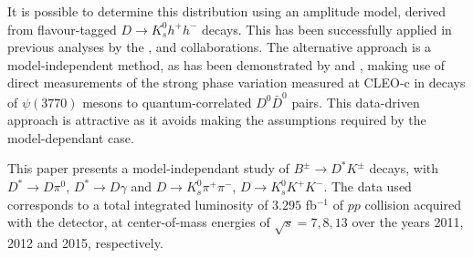 It is possible to determine this distribution using an amplitude model, derived from flavour-tagged $D\rightarrow K^0_sh^+h^-$ decays. This has been successfully applied in previous analyses by the \babar, \belle and \lhcb collaborations. The alternative approach is a model-independent method, as has been demonstrated by \belle and \lhcb, making use of direct  measurements of the strong phase
variation measured at CLEO-c in decays of $\psi(3770)$ mesons to quantum-correlated $D^0\bar{D}^0$ pairs. This data-driven approach is attractive as it avoids making the assumptions required by the model-dependant case.

This paper presents a model-independant study of $B^{\pm}\rightarrow D^*K^{\pm}$ decays, with $D^{*}\rightarrow D\pi^0$, $D^{*}\rightarrow D\gamma$ and $D\rightarrow K^0_s\pi^+\pi^-$, $D\rightarrow K^0_sK^+K^-$. The data used corresponds to a total integrated luminosity of $3.295$ fb$^{-1}$ of $pp$ collision acquired with the \lhcb detector, at center-of-mass energies of $\sqrt{s}=7,8,13$ \tev over the years 2011, 2012 and 2015, respectively.

~\cite{Alves:2008zz} ~\cite{REVTeX}

